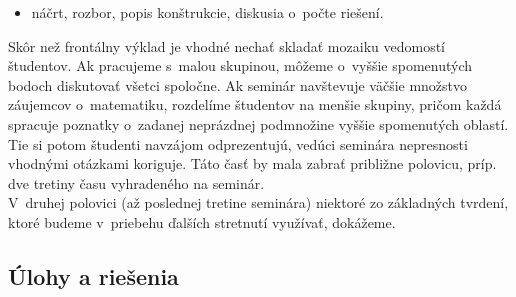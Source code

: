 {\begin{itemize}
\begin{itemize}
\item náčrt, rozbor, popis konštrukcie, diskusia o~počte riešení.
\end{itemize}
\end{itemize}
\kom Skôr než frontálny výklad je vhodné nechať skladať mozaiku vedomostí študentov. Ak pracujeme s~malou skupinou, môžeme o~vyššie spomenutých bodoch diskutovať všetci spoločne. Ak seminár navštevuje väčšie množstvo záujemcov o~matematiku, rozdelíme študentov na menšie skupiny, pričom každá spracuje poznatky o~zadanej neprázdnej podmnožine vyššie spomenutých oblastí. Tie si potom študenti navzájom odprezentujú, vedúci seminára nepresnosti vhodnými otázkami koriguje. Táto časť by mala zabrať približne polovicu, príp. dve tretiny času vyhradeného na seminár.
\\
\kom V~druhej polovici (až poslednej tretine seminára) niektoré zo základných tvrdení, ktoré budeme v~priebehu ďalších stretnutí využívať, dokážeme.\\
}

\subsection*{Úlohy a riešenia}
















\home{






%
}


